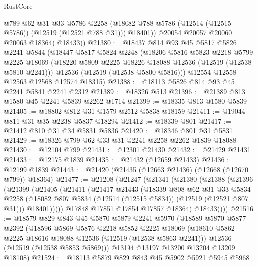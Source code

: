 \begin{lexlean}{RustCore}
\begin{coremodule}
              @789
              @62
              @31
              @33
              @5786
              @2258
              (@18082 @788 @5786 (@12514 (@12515 @5786)) (@12519 (@12521 @788 @31)))
              @18401))
          @20054
          @20057
          @20060
          @20063
          @18364)
        @18433))
@21380 := @18437
    @814
    @93
    @45
    @5817
    @5826
    @2241
    @5844
    (@18447
      @5817
      @5824
      @2248
      (@18206
        @5816
        @5823
        @2218
        @5799
        @2225
        @18069
        (@18220 @5809 @2225 @18226 @18088 @12536 (@12519 (@12538 @5810 @2241)))
        @12536
        (@12519 (@12538 @5800 @5816)))
      @12554
      @12558
      @12563
      @12568
      @12574
      @18315)
@21388 := @18113 @5826 @814 @93 @45 @2241 @5841 @2241 @2312
@21389 := @18326 @513
@21396 := @21389 @813 @1580 @45 @2241 @5839 @2262 @1714
@21399 := @18335 @813 @1580 @5839
@21405 := @18802 @812 @31 @1579 @2512 @5838 @18159
@21411 := @19044 @811 @31 @35 @2238 @5837 @18294
@21412 := @18339 @801
@21417 := @21412 @810 @31 @34 @5831 @5836
@21420 := @18346 @801 @31 @5831
@21429 := @18326 @799 @62 @33 @31 @2241 @2258 @2262 @1839 @18088
@21430 := @12104 @799
@21431 := @12301 @21430
@21432 := @21429 @21431
@21433 := @12175 @1839
@21435 := @21432 (@12659 @21433)
@21436 := @12199 @1839
@21443 := @21420 (@21435 (@12663 @21436) (@12668 (@12670 @799)) @18364)
@21477 := @21208
    (@21247
      (@21341
        (@21380
          (@21388
            (@21396
              (@21399
                (@21405
                  (@21411
                    (@21417
                      @21443
                      (@18339
                        @808
                        @62
                        @31
                        @33
                        @5834
                        @2258
                        (@18082 @807 @5834 (@12514 (@12515 @5834)) (@12519 (@12521 @807 @31)))
                        @18401)))))
              @17848
              @17851
              @17854
              @17857
              @18364)
            @18433))))
@21516 := @18579
    @829
    @843
    @45
    @5870
    @5879
    @2241
    @5970
    (@18589
      @5870
      @5877
      @2392
      (@18596
        @5869
        @5876
        @2218
        @5852
        @2225
        @18069
        (@18610 @5862 @2225 @18616 @18088 @12536 (@12519 (@12538 @5863 @2241)))
        @12536
        (@12519 (@12538 @5853 @5869)))
      @13194
      @13197
      @13200
      @13204
      @13209
      @18108)
@21524 := @18113 @5879 @829 @843 @45 @5902 @5921 @5945 @5968

\end{coremodule}
\end{lexlean}
